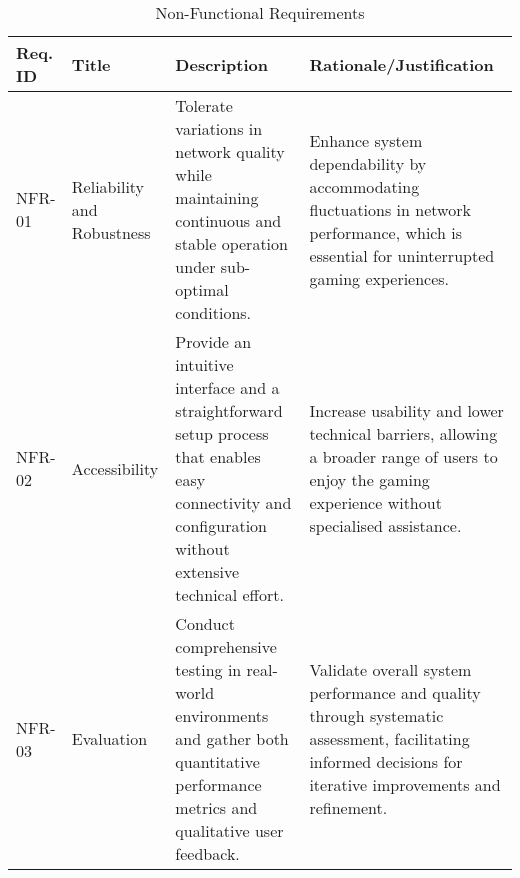 \begin{table}[!ht]
    \centering
    \begin{tabular}{|p{1cm}|p{3cm}|p{6cm}|p{5cm}|}
    \hline
        Req. ID & Title & Description & Rationale/Justification \\ \hline
        NFR-01 & Reliability and Robustness & Tolerate variations in network quality while maintaining continuous and stable operation under sub-optimal conditions. & Enhance system dependability by accommodating fluctuations in network performance, which is essential for uninterrupted gaming experiences. \\ \hline
        NFR-02 & Accessibility & Provide an intuitive interface and a straightforward setup process that enables easy connectivity and configuration without extensive technical effort. & Increase usability and lower technical barriers, allowing a broader range of users to enjoy the gaming experience without specialised assistance. \\ \hline
        NFR-03 & Evaluation & Conduct comprehensive testing in real-world environments and gather both quantitative performance metrics and qualitative user feedback. & Validate overall system performance and quality through systematic assessment, facilitating informed decisions for iterative improvements and refinement. \\ \hline
    \end{tabular}
    \caption{Non-Functional Requirements}
    \label{tab:non-functional-requirements}
\end{table}
